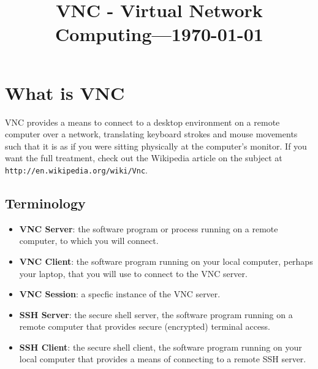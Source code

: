 \documentclass[11pt,preprint]{aastex}
\begin{document}
\title{VNC - Virtual Network Computing---\today}



\section{What is VNC}  
VNC provides a means to connect to a desktop environment on a remote computer over a network, translating keyboard strokes and mouse movements 
such that it is as if you were sitting physically at the computer's monitor.  If you want the full treatment, check out the Wikipedia article on the subject at \verb$http://en.wikipedia.org/wiki/Vnc$.  

\subsection{Terminology}
\begin{itemize}
\item {\bf VNC Server}: the software program or process running on a remote computer, to which you will connect.
\item {\bf VNC Client}: the software program running on your local computer, perhaps your laptop, that you will use to connect to the VNC server.
\item {\bf VNC Session}: a specfic instance of the VNC server.
\item {\bf SSH Server}: the secure shell server, the software program running on a remote computer that provides secure (encrypted) terminal access.
\item {\bf SSH Client}: the secure shell client, the software program running on your local computer that provides a means of connecting to a remote SSH server.
\end{itemize}
\end{document}
